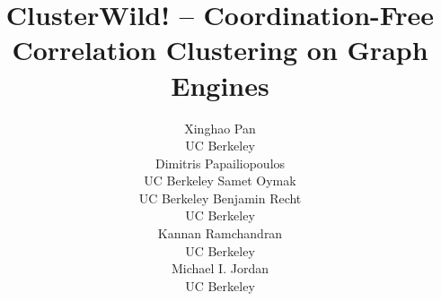 \documentclass{article} %
\begin{document}
\title{ClusterWild! -- Coordination-Free Correlation Clustering on Graph Engines}



\author{
Xinghao Pan\\
       UC Berkeley\\
       \And
Dimitris Papailiopoulos\\
{UC Berkeley}
\And
Samet Oymak\\
{UC Berkeley}
\AND
Benjamin Recht\\
{UC Berkeley}\\
\And
Kannan Ramchandran\\
{UC Berkeley}\\
\And
Michael I. Jordan\\
{UC Berkeley}\\
} 
\end{document}
